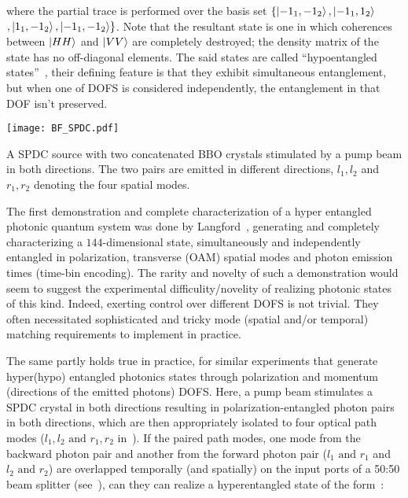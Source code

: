\noindent
where the partial trace is performed over the basis set $\{\ket{-1_1,-1_2}, \ket{-1_1,1_2}$ $, \ket{1_1,-1_2}, \ket{-1_1,-1_2}\}$. Note that the resultant state is one in which coherences between $\ket{HH}$ and $\ket{VV}$ are completely destroyed; the density matrix of the state has no off-diagonal elements. The said states are called \enquote{hypoentangled states}~\cite{Nathan_PhD}, their defining feature is that they exhibit simultaneous entanglement, but when one of \acs{DOFS} is considered independently, the entanglement in that \acs{DOF} isn't preserved. 

\begin{marginfigure}
	\texttt{[image: BF\_SPDC.pdf]}
	\caption[A \acs{SPDC} source with two concatenated \acs{BBO} crystals stimulated by a pump beam in both directions.]{A \acs{SPDC} source with two concatenated \acs{BBO} crystals stimulated by a pump beam in both directions. The two pairs are emitted in different directions, $l_1, l_2$ and $r_1, r_2$ denoting the four spatial modes.}
\end{marginfigure}

\bigskip
\noindent
The first demonstration and complete characterization of a hyper entangled photonic quantum system was done by Langford~\cite{Nathan_PhD}, generating and completely characterizing a $144$-dimensional state, simultaneously and independently entangled in polarization, transverse (\acs{OAM}) spatial modes and photon emission times (time-bin encoding). The rarity and novelty of such a demonstration would seem to suggest the experimental difficulity/novelity of realizing photonic states of this kind. Indeed, exerting control over different \acs{DOFS} is not trivial. They often necessitated sophisticated and tricky mode (spatial and/or temporal) matching requirements to implement in practice.

\bigskip
\noindent
The same partly holds true in practice, for similar experiments that generate hyper(hypo) entangled photonics states through polarization and momentum (directions of the emitted photons) \acs{DOFS}. Here, a pump beam stimulates a \acs{SPDC} crystal in both directions resulting in polarization-entangled photon pairs in both directions, which are then appropriately isolated to four optical path modes ($l_1, l_2\text{ and }r_1, r_2$ in~). If the paired path modes, one mode from the backward photon pair and another from the forward photon pair ($l_1\text{ and }r_1$ and $l_2\text{ and }r_2$) are overlapped temporally (and spatially) on the input ports of a 50:50 beam splitter (see~), can they can realize a hyperentangled state of the form~\cite{Yang_2005}:

